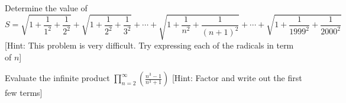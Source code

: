 \begin{prob}[USAMTS]  Determine the value of $$S=\sqrt{1+\frac{1}{1^2}+\frac{1}{2^2}}+\sqrt{1+\frac{1}{2^2}+\frac{1}{3^2}}+\cdots+\sqrt{1+\frac{1}{n^2}+\frac{1}{(n+1)^2}}+\cdots+\sqrt{1+\frac{1}{1999^2}+\frac{1}{2000^2}}$$  [Hint:  This problem is very difficult.  Try expressing each of the radicals in term of $n$] \end{prob}
\begin{prob}  Evaluate the infinite product $\displaystyle \prod_{n=2}^{\infty}\left(\frac{n^3-1}{n^3+1}\right)$  [Hint:  Factor and write out the first few terms]  \end{prob}  



